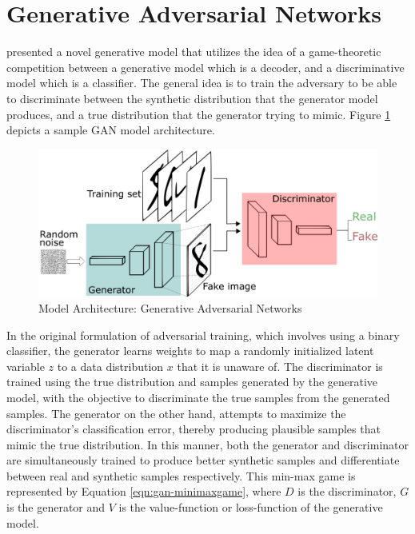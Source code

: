 \section{Generative Adversarial Networks}

\cite{goodfellow2014generative} presented a novel generative model that utilizes the idea of a game-theoretic competition between a generative model which is a decoder, and a discriminative model which is a classifier. The general idea is to train the adversary to be able to discriminate between the synthetic distribution that the generator model produces, and a true distribution that the generator trying to mimic. Figure \ref{fig:gans} depicts a sample GAN model architecture.

\begin{figure}[ht]
	\centering
	\includegraphics[width=\textwidth]{images/gans}
	\caption{\label{fig:gans} Model Architecture: Generative Adversarial Networks}
\end{figure}

In the original formulation of adversarial training, which involves using a binary classifier, the generator learns weights to map a randomly initialized latent variable $z$ to a data distribution $x$ that it is unaware of. The discriminator is trained using the true distribution and samples generated by the generative model, with the objective to discriminate the true samples from the generated samples. The generator on the other hand, attempts to maximize the discriminator's classification error, thereby producing plausible samples that mimic the true distribution. In this manner, both the generator and discriminator are simultaneously trained to produce better synthetic samples and differentiate between real and synthetic samples respectively. This min-max game is represented by Equation \ref{eqn:gan-minimaxgame}, where $D$ is the discriminator, $G$ is the generator and $V$ is the value-function or loss-function of the generative model.

